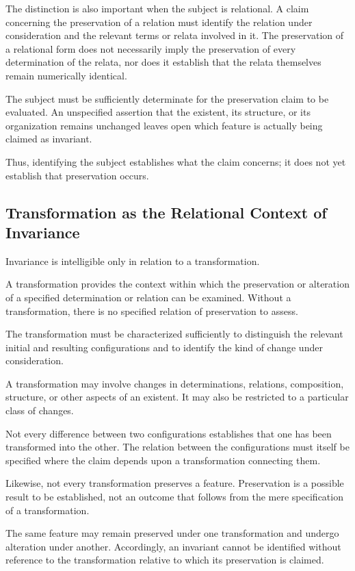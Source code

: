 The distinction is also important when the
subject is relational. A claim concerning the
preservation of a relation must identify the
relation under consideration and the relevant
terms or relata involved in it. The preservation
of a relational form does not necessarily imply
the preservation of every determination of
the relata, nor does it establish that the
relata themselves remain numerically identical.

The subject must be sufficiently determinate
for the preservation claim to be evaluated.
An unspecified assertion that the existent,
its structure, or its organization remains
unchanged leaves open which feature is actually
being claimed as invariant.

Thus, identifying the subject establishes
what the claim concerns; it does not yet
establish that preservation occurs.

\subsection{Transformation as the Relational Context of Invariance}

Invariance is intelligible only in relation
to a transformation.

A transformation provides the context within
which the preservation or alteration of a
specified determination or relation can be
examined. Without a transformation, there
is no specified relation of preservation
to assess.

The transformation must be characterized
sufficiently to distinguish the relevant
initial and resulting configurations and
to identify the kind of change under
consideration.

A transformation may involve changes in
determinations, relations, composition,
structure, or other aspects of an existent.
It may also be restricted to a particular
class of changes.

Not every difference between two configurations
establishes that one has been transformed
into the other. The relation between the
configurations must itself be specified
where the claim depends upon a transformation
connecting them.

Likewise, not every transformation preserves
a feature. Preservation is a possible result
to be established, not an outcome that follows
from the mere specification of a transformation.

The same feature may remain preserved under
one transformation and undergo alteration
under another. Accordingly, an invariant
cannot be identified without reference to
the transformation relative to which its
preservation is claimed.

